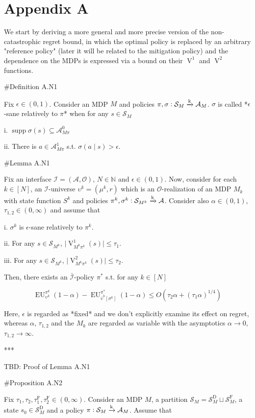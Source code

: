 \documentclass[a4paper]{article}
\DeclareMathOperator{\Supp}{supp}
\newcommand{\AP}[1]{\left(#1\right)}
\newcommand{\AB}[1]{\left[#1\right]}
\newcommand{\Nats}{\mathbb{N}}
\newcommand{\Abs}[1]{\lvert #1 \rvert}
\newcommand{\M}{\xrightarrow{\textnormal{k}}}
\newcommand{\Ob}{\mathcal{O}}
\newcommand{\A}{\mathcal{A}}
\newcommand{\St}{\mathcal{S}}
\newcommand{\In}{\mathcal{I}}
\newcommand{\Adi}{{\bar{\In}}}
\newcommand{\SF}{\St^{\text{F}}}
\newcommand{\SD}{\St^{\text{D}}}
\newcommand{\TF}{\tau^{\text{F}}}
\newcommand{\V}{\operatorname{V}}
\newcommand{\EU}{\operatorname{EU}}
\begin{document}
\section{Appendix A}

We start by deriving a more general and more precise version of the non-catastrophic regret bound, in which the optimal policy is replaced by an arbitrary "reference policy" (later it will be related to the mitigation policy) and the dependence on the MDPs is expressed via a bound on their $\V^1$ and $\V^2$ functions.

\#Definition A.N1

Fix $\epsilon\in(0,1)$. Consider an MDP $M$ and policies $\pi,\sigma: \St_M \M \A_M$. $\sigma$ is called *$\epsilon$-sane relatively to $\pi$* when for any $s \in \St_M$

i. $\Supp{\sigma(s)} \subseteq \A_{M\pi}^0$

ii. There is $a \in \A_{M\pi}^1$ s.t. $\sigma(a \mid s) > \epsilon$.

\#Lemma A.N1

Fix an interface $\In=(\A,\Ob)$, $N \in \Nats$ and $\epsilon \in (0,1)$. Now, consider for each $k \in [N]$, an $\In$-universe $\upsilon^k=(\mu^k,r)$ which is an $\Ob$-realization of an MDP $M_k$ with state function $S^k$ and policies $\pi^k,\sigma^k: \St_{M^k} \M \A$. Consider also $\alpha\in(0,1)$, $\tau_{1,2} \in (0,\infty)$ and assume that 

i. $\sigma^k$ is $\epsilon$-sane relatively to $\pi^k$.

ii. For any $s \in \St_{M^k}$, $\Abs{\V^1_{M^k\pi^k}(s)} \leq \tau_1$.

iii. For any $s \in \St_{M^k}$, $\Abs{\V^2_{M^k\pi^k}(s)} \leq \tau_2$.

Then, there exists an $\Adi$-policy $\pi^*$ s.t. for any $k \in [N]$

$$\EU_{\upsilon^k}^{\pi^k}(1-\alpha) - \EU_{\bar{\upsilon}^k\AB{\sigma^k}}^{\pi^*}(1-\alpha) \leq O\AP{\tau_2 \alpha + (\tau_1 \alpha)^{1/4}}$$

Here, $\epsilon$ is regarded as *fixed* and we don't explicitly examine its effect on regret, whereas $\alpha$, $\tau_{1,2}$ and the $M_k$ are regarded as variable with the asymptotics $\alpha \rightarrow 0$, $\tau_{1,2} \rightarrow \infty$.

***

TBD: Proof of Lemma A.N1 %

\#Proposition A.N2

Fix $\tau_1, \tau_2, \TF_1, \TF_2 \in (0,\infty)$. Consider an MDP $M$, a partition $\St_M = \SD_M \sqcup \SF_M$, a state $s_0 \in \SD_M$ and a policy $\pi: \St_M \M \A_M$. Assume that
\end{document}
